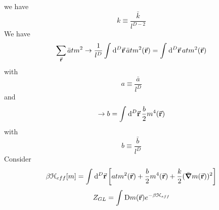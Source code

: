 \documentclass[../main/main.tex]{subfiles}
\begin{document}
we have
\begin{equation}
  k \equiv \frac{\bar{k} }{l^{D-2}}
\end{equation}
We have
\begin{equation}
  \sum_{\va{r}}^{} \bar{a}  t m^2 \rightarrow  \frac{1}{l^D} \int_{}^{} \dd[D]{\va{r}}  \bar{a}   t m^2 (\va{r}) = \int_{}^{} \dd[D]{\va{r}}  a t m^2 (\va{r})
\end{equation}
with
\begin{equation}
  a \equiv \frac{\bar{a} }{l^D}
\end{equation}
and
\begin{equation}
  \rightarrow b = \int_{}^{} \dd[D]{\va{r}} \frac{b}{2} m^4 (\va{r})
\end{equation}
with
\begin{equation}
  b \equiv \frac{\bar{b} }{l^D}
\end{equation}
Consider
\begin{equation}
  \beta \mathcal{H}_{eff} [m] = \int_{}^{} \dd[D]{\va{r}} \qty[a t m^2 (\va{r}) + \frac{b}{2} m^4 (\va{r}) + \frac{k}{2} (\bar{\grad } m (\va{r}))^2]
\end{equation}
\begin{equation}
  Z_{GL} = \int_{}^{} \text{D} m(\va{r}) e^{-\beta \mathcal{H}_{eff}}
\end{equation}
\end{document}
